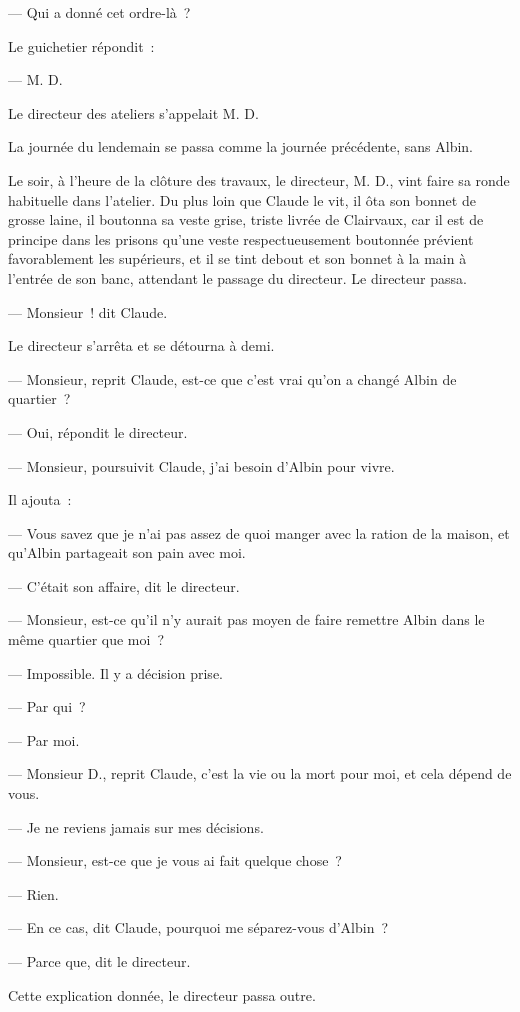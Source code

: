 \documentclass[french,twoside]{book} %
\begin{document}
— Qui a donné cet ordre-là ?\par
Le guichetier répondit :\par
— M. D.\par
Le directeur des ateliers s’appelait M. D.\par
La journée du lendemain se passa comme la journée précédente, sans Albin.\par
Le soir, à l’heure de la clôture des travaux, le directeur, M. D., vint faire sa ronde habituelle dans l’atelier. Du plus loin que Claude le vit, il ôta son bonnet de grosse laine, il boutonna sa veste grise, triste livrée de Clairvaux, car il est de principe dans les prisons qu’une veste respectueusement boutonnée prévient favorablement les supérieurs, et il se tint debout et son bonnet à la main à l’entrée de son banc, attendant le passage du directeur. Le directeur passa.\par
— Monsieur ! dit Claude.\par
Le directeur s’arrêta et se détourna à demi.\par
— Monsieur, reprit Claude, est-ce que c’est vrai qu’on a changé Albin de quartier ?\par
— Oui, répondit le directeur.\par
— Monsieur, poursuivit Claude, j’ai besoin d’Albin pour vivre.\par
Il ajouta :\par
 — Vous savez que je n’ai pas assez de quoi manger avec la ration de la maison, et qu’Albin partageait son pain avec moi.\par
— C’était son affaire, dit le directeur.\par
— Monsieur, est-ce qu’il n’y aurait pas moyen de faire remettre Albin dans le même quartier que moi ?\par
— Impossible. Il y a décision prise.\par
— Par qui ?\par
— Par moi.\par
— Monsieur D., reprit Claude, c’est la vie ou la mort pour moi, et cela dépend de vous.\par
— Je ne reviens jamais sur mes décisions.\par
— Monsieur, est-ce que je vous ai fait quelque chose ?\par
— Rien.\par
— En ce cas, dit Claude, pourquoi me séparez-vous d’Albin ?\par
— Parce que, dit le directeur.\par
Cette explication donnée, le directeur passa outre.\par
\end{document}

